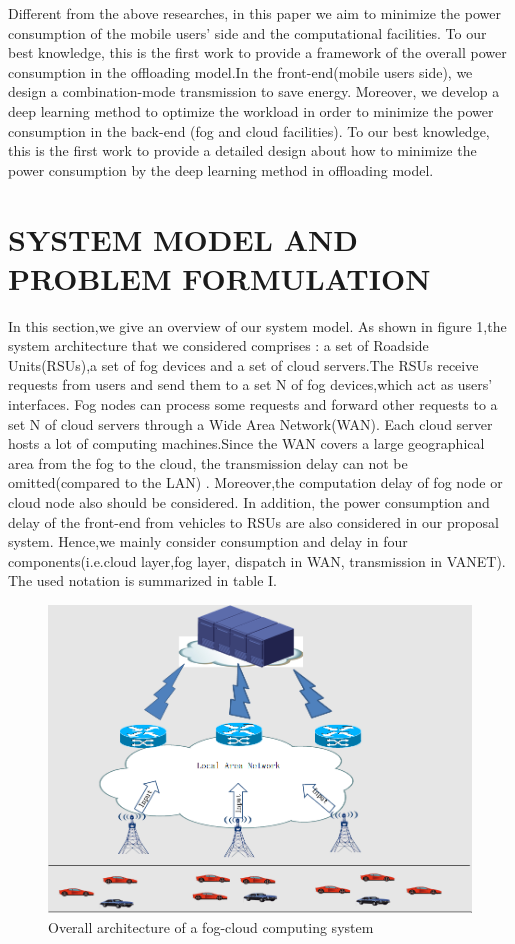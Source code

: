 \documentclass[journal]{IEEEtran}
\begin{document}
Different from the above researches, in this paper we aim to minimize the power consumption of the mobile users' side and the computational facilities. To our best knowledge, this is the first work to provide a framework of the  overall power consumption in the offloading model.In the front-end(mobile users side), we design a combination-mode transmission to save energy. Moreover, we develop a deep learning method to optimize the workload in order to minimize the power consumption in the back-end (fog and cloud facilities). To our best knowledge, this is the first work to provide a detailed design about how to minimize the power consumption by the deep learning method in offloading model.

\section{SYSTEM MODEL AND PROBLEM FORMULATION}
In this section,we give an overview of our system model. As shown in figure 1,the system architecture that we considered comprises : a set of Roadside Units(RSUs),a set of fog devices and a set of cloud servers.The RSUs receive requests from users and send them to a set N of fog devices,which act as users' interfaces. Fog nodes can process some requests and forward other requests to a set N of cloud servers through a Wide Area Network(WAN). Each cloud server hosts a lot of computing machines.Since the WAN covers a large geographical area from the fog to the cloud, the transmission delay can not be omitted(compared to the LAN)  \cite{16}. Moreover,the computation delay of fog node or cloud node also should be considered. In addition, the power consumption and delay of the front-end from vehicles to RSUs are also considered in our proposal system. Hence,we mainly consider consumption and delay in four components(i.e.cloud layer,fog layer, dispatch in WAN, transmission in VANET). The used notation is summarized in table I.
\begin{figure}[h]
\centering
\includegraphics[scale=0.4]{4.png}
\caption{Overall architecture of a fog-cloud computing system}
\label{fig:label}
\end{figure}
\end{document}
